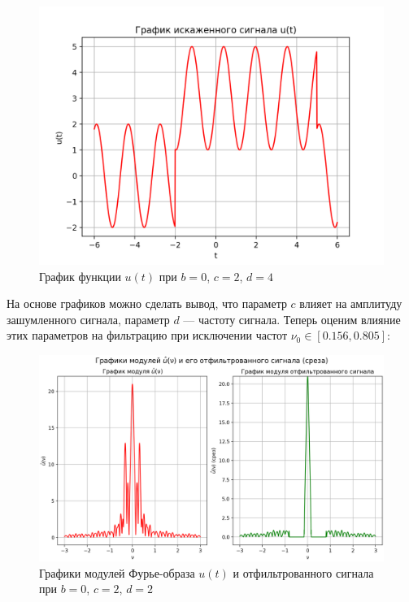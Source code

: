 \begin{figure}[ht!]
    \centering
    \includegraphics[scale=0.75]{media/1 task/specific_freq/Noisy_0_2_4.png}
    \caption{График функции $u(t)$ при $b=0$,  $c=2$,  $d=4$}
    \label{fig:noisy_0_2_4}
\end{figure}

На основе графиков можно сделать вывод, что параметр $c$ влияет на амплитуду зашумленного сигнала, параметр $d$ --- частоту сигнала. Теперь оценим влияние этих параметров на фильтрацию при исключении частот $\nu_0\in[0.156, 0.805]$:


\begin{figure}[ht!]
    \centering
    \includegraphics[scale=0.55]{media/1 task/specific_freq/Fourier_Image_0_2_2_-0,805:-0,156.png}
    \caption{Графики модулей Фурье-образа $u(t)$ и отфильтрованного сигнала при $b=0$,  $c=2$,  $d=2$}
    \label{fig:four_0_2_2}
\end{figure}

